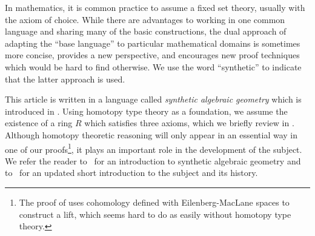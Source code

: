In mathematics, it is common practice to assume a fixed set theory, usually with the axiom of choice. While there are advantages to working in one common language and sharing many of the basic constructions, the dual approach of adapting the ``base language'' to particular mathematical domains is sometimes more concise, provides a new perspective, and encourages new proof techniques which would be hard to find otherwise. We use the word ``synthetic'' to indicate that the latter approach is used.

This article is written in a language called \emph{synthetic algebraic geometry} which is introduced in \cite{draft}.  Using homotopy type theory as a foundation, we assume the existence of a ring $R$ which satisfies three axioms, which we briefly review in . Although homotopy theoretic reasoning will only appear in an essential way in one of our proofs\footnote{The proof of  uses cohomology defined with Eilenberg-MacLane spaces to construct a lift, which seems hard to do as easily without homotopy type theory. }, it plays an important role in the development of the subject. We refer the reader to~\cite{draft} for an introduction to synthetic algebraic geometry and to~\cite{overview} for an updated short introduction to the subject and its history.
